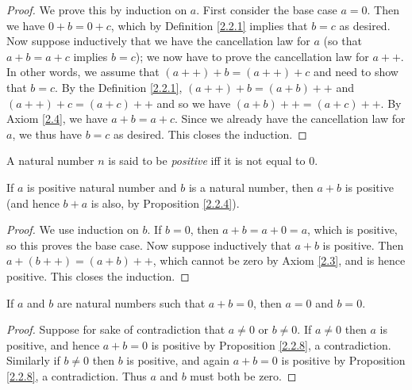 \begin{proof}
    We prove this by induction on \(a\).
    First consider the base case \(a = 0\).
    Then we have \(0 + b = 0 + c\), which by Definition \ref{2.2.1} implies that \(b = c\) as desired.
    Now suppose inductively that we have the cancellation law for \(a\) (so that \(a + b = a + c\) implies \(b = c\));
    we now have to prove the cancellation law for \(a++\).
    In other words, we assume that \((a++) + b = (a++) + c\) and need to show that \(b = c\).
    By the Definition \ref{2.2.1}, \((a++) + b = (a + b)++\) and \((a++) + c = (a + c)++\) and so we have \((a + b)++ = (a + c)++\).
    By Axiom \ref{2.4}, we have \(a + b = a + c\).
    Since we already have the cancellation law for \(a\), we thus have \(b = c\) as desired.
    This closes the induction.
\end{proof}

\begin{definition}\label{2.2.7}
    A natural number \(n\) is said to be \emph{positive} iff it is not equal to \(0\).
\end{definition}

\begin{proposition}\label{2.2.8}
    If \(a\) is positive natural number and \(b\) is a natural number, then \(a + b\) is positive (and hence \(b + a\) is also, by Proposition \ref{2.2.4}).
\end{proposition}

\begin{proof}
    We use induction on \(b\).
    If \(b = 0\), then \(a + b = a + 0 = a\), which is positive, so this proves the base case.
    Now suppose inductively that \(a + b\) is positive.
    Then \(a + (b++) = (a + b)++\), which cannot be zero by Axiom \ref{2.3}, and is hence positive.
    This closes the induction.
\end{proof}

\begin{corollary}\label{2.2.9}
    If \(a\) and \(b\) are natural numbers such that \(a + b = 0\), then \(a = 0\) and \(b = 0\).
\end{corollary}

\begin{proof}
    Suppose for sake of contradiction that \(a \neq 0\) or \(b \neq 0\).
    If \(a \neq 0\) then \(a\) is positive, and hence \(a + b = 0\) is positive by Proposition \ref{2.2.8}, a contradiction.
    Similarly if \(b \neq 0\) then \(b\) is positive, and again \(a + b = 0\) is positive by Proposition \ref{2.2.8}, a contradiction.
    Thus \(a\) and \(b\) must both be zero.
\end{proof}

